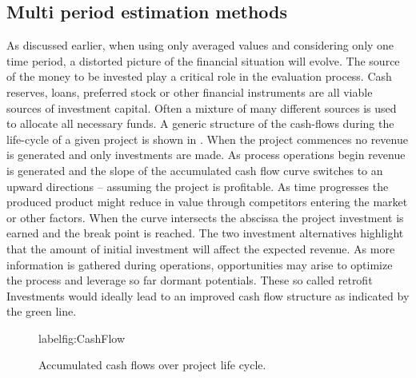 \subsection{Multi period estimation methods}
\label{sec:MultiPeriod}
    As discussed earlier, when using only averaged values and considering only one time period,
    a distorted picture of the financial situation will evolve. The source of the money to be invested
    play a critical role in the evaluation process. Cash reserves, loans, preferred stock or other financial
    instruments are all viable sources of investment capital. Often a mixture of many different sources is
    used to allocate all necessary funds. A generic structure of the cash-flows during the life-cycle of a
    given project is shown in . When the project commences no revenue is generated
    and only investments are made. As process operations begin revenue is generated and  the slope
    of the accumulated cash flow curve switches to an upward directions -- assuming the project is profitable.
    As time progresses the produced product might reduce in value through competitors entering the market
    or other factors. When the curve intersects the abscissa the project investment is earned and the break
    point is reached. The two investment alternatives highlight that the amount of initial investment
    will affect the expected revenue. As more information is gathered during operations, opportunities
    may arise to optimize the process and leverage so far dormant potentials. These so called retrofit
    Investments would ideally lead to an improved cash flow structure as indicated by the green line.

    \begin{figure}
        
        \caption{Accumulated cash flows over project life cycle.}
        label{fig:CashFlow}
    \end{figure}

